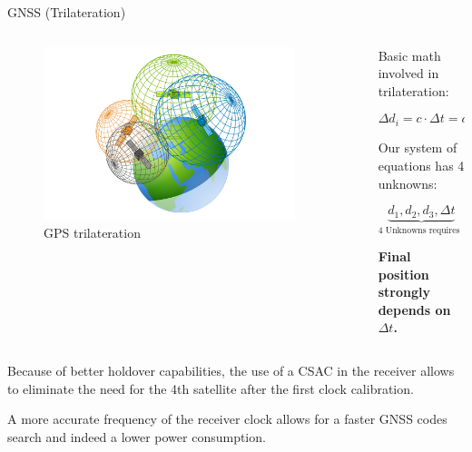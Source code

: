 \begin{frame}{GNSS (Trilateration)}

    \begin{columns}[c, onlytextwidth]

        \begin{column}{0.5\textwidth}

            \begin{figure}[H]
                \centering
                \includegraphics[width=0.9\textwidth]{img/GPS-Trilateration.png}
                \caption{GPS trilateration}
            \end{figure}

        \end{column}

        \begin{column}{0.5\textwidth}

            Basic math involved in trilateration:

            \begin{equation*}
                \Delta d_i = c \cdot \Delta t = c \cdot (t_{\text{sat}} - t_{\text{rcvr}})
            \end{equation*}

            Our system of equations has 4 unknowns:

            \begin{equation*}
                \underbrace{d_1, d_2, d_3, \Delta t}_\text{4 Unknowns requires 4 satellites}
            \end{equation*}

            \textbf{Final position strongly depends on $\Delta t$.}

        \end{column}

    \end{columns}

    \vspace{10pt}

    Because of better holdover capabilities, the use of a CSAC in the receiver allows to eliminate the need for the 4th satellite after the first clock calibration.

    A more accurate frequency of the receiver clock allows for a faster GNSS codes search and indeed a lower power consumption.

\end{frame}